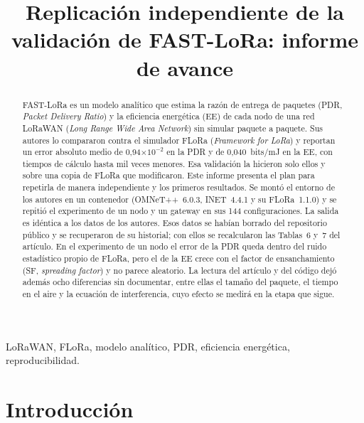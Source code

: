 \documentclass[conference,a4paper]{IEEEtran}
\begin{document}
\title{Replicación independiente de la validación de FAST-LoRa: informe de avance}

\author{
}

\maketitle

\begin{abstract}
FAST-LoRa es un modelo analítico que estima la razón de entrega de paquetes (PDR, \emph{Packet Delivery Ratio}) y la eficiencia energética (EE) de cada nodo de una red LoRaWAN (\emph{Long Range Wide Area Network}) sin simular paquete a paquete. Sus autores lo compararon contra el simulador FLoRa (\emph{Framework for LoRa}) y reportan un error absoluto medio de 0,94$\times10^{-2}$ en la PDR y de 0,040~bits/mJ en la EE, con tiempos de cálculo hasta mil veces menores. Esa validación la hicieron solo ellos y sobre una copia de FLoRa que modificaron. Este informe presenta el plan para repetirla de manera independiente y los primeros resultados. Se montó el entorno de los autores en un contenedor (OMNeT++~6.0.3, INET~4.4.1 y su FLoRa~1.1.0) y se repitió el experimento de un nodo y un gateway en sus 144 configuraciones. La salida es idéntica a los datos de los autores. Esos datos se habían borrado del repositorio público y se recuperaron de su historial; con ellos se recalcularon las Tablas~6 y~7 del artículo. En el experimento de un nodo el error de la PDR queda dentro del ruido estadístico propio de FLoRa, pero el de la EE crece con el factor de ensanchamiento (SF, \emph{spreading factor}) y no parece aleatorio. La lectura del artículo y del código dejó además ocho diferencias sin documentar, entre ellas el tamaño del paquete, el tiempo en el aire y la ecuación de interferencia, cuyo efecto se medirá en la etapa que sigue.
\end{abstract}

\begin{IEEEkeywords}
LoRaWAN, FLoRa, modelo analítico, PDR, eficiencia energética, reproducibilidad.
\end{IEEEkeywords}

\section{Introducción}
\end{document}
